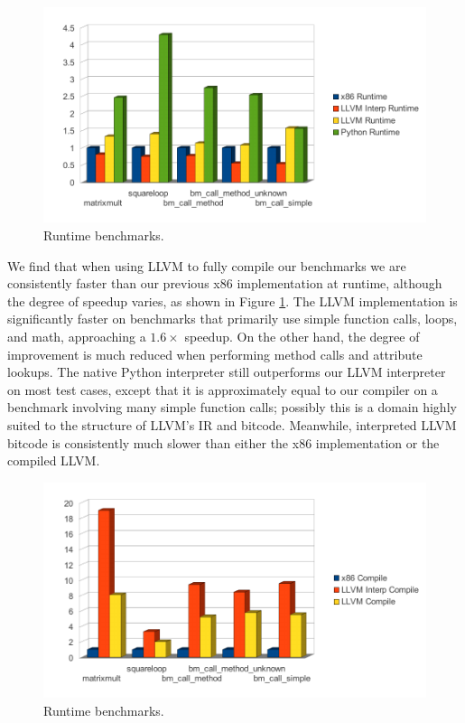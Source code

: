 \documentclass[11pt,twocolumn]{article}
\begin{document}
\begin{figure}[htb]
  \centering
  \includegraphics[scale=.9]{include/pdf/runtime.pdf}
  \caption{Runtime benchmarks.}
  \label{fig:rt}
\end{figure}

We find that when using LLVM to fully compile our benchmarks we are
consistently faster than our previous x86 implementation at runtime,
although the degree of speedup varies, as shown in Figure
\ref{fig:rt}. The LLVM implementation is significantly faster on
benchmarks that primarily use simple function calls, loops, and math,
approaching a $1.6\times$ speedup. On the other hand, the degree of
improvement is much reduced when performing method calls and attribute
lookups. The native Python interpreter still outperforms our LLVM
interpreter on most test cases, except that it is approximately equal
to our compiler on a benchmark involving many simple function calls;
possibly this is a domain highly suited to the structure of LLVM's IR
and bitcode. Meanwhile, interpreted LLVM bitcode is consistently much
slower than either the x86 implementation or the compiled LLVM.

\begin{figure}[htb]
  \centering
  \includegraphics[scale=.9]{include/pdf/compiletime.pdf}
  \caption{Runtime benchmarks.}
  \label{fig:ct}
\end{figure}
\end{document}
